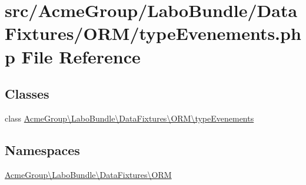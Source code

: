 \hypertarget{type_evenements_8php}{\section{src/\+Acme\+Group/\+Labo\+Bundle/\+Data\+Fixtures/\+O\+R\+M/type\+Evenements.php File Reference}
\label{type_evenements_8php}
}
\subsection*{Classes}
\begin{DoxyCompactItemize}
\item 
class \hyperlink{class_acme_group_1_1_labo_bundle_1_1_data_fixtures_1_1_o_r_m_1_1type_evenements}{Acme\+Group\textbackslash{}\+Labo\+Bundle\textbackslash{}\+Data\+Fixtures\textbackslash{}\+O\+R\+M\textbackslash{}type\+Evenements}
\end{DoxyCompactItemize}
\subsection*{Namespaces}
\begin{DoxyCompactItemize}
\item 
 \hyperlink{namespace_acme_group_1_1_labo_bundle_1_1_data_fixtures_1_1_o_r_m}{Acme\+Group\textbackslash{}\+Labo\+Bundle\textbackslash{}\+Data\+Fixtures\textbackslash{}\+O\+R\+M}
\end{DoxyCompactItemize}
